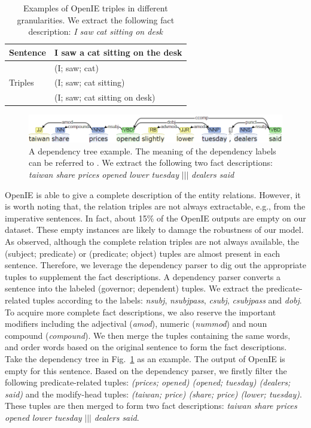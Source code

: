 \documentclass[letterpaper]{article} %
\begin{document}
	\begin{table}[t]
		\centering
		\begin{tabular}{l|l}
			\hline
			Sentence                   & I saw a cat sitting on the desk \\ \hline
			\multirow{3}{*}{Triples} & (I; saw; cat)                \\ \cline{2-2} 
			& (I; saw; cat sitting)           \\ \cline{2-2} 
			& (I; saw; cat sitting on desk)   \\ \hline
		\end{tabular}
		\caption{Examples of OpenIE triples in different granularities. We extract the following fact description: \textit{I saw cat sitting on desk}}
		\label{tb:openie_triple}
	\end{table}
	
	\begin{figure}
		\centering
		\includegraphics[width=0.75\linewidth]{depparse}
		\caption{A dependency tree example. The meaning of the dependency labels can be referred to \cite{de2008stanford}. We extract the following two fact descriptions: \textit{taiwan share prices opened lower tuesday} $|||$ \textit{dealers said}}
		\label{fig:depparse}
	\end{figure}
	
	OpenIE is able to give a complete description of the entity relations.
	However, it is worth noting that, the relation triples are not always extractable, e.g., from the imperative sentences.
	In fact, about 15\% of the OpenIE outputs are empty on our dataset.
	These empty instances are likely to damage the robustness of our model.
	As observed, although the complete relation triples are not always available, the (subject; predicate) or (predicate; object) tuples are almost present in each sentence.
	Therefore, we leverage the dependency parser to dig out the appropriate tuples to supplement the fact descriptions.
	A dependency parser converts a sentence into the labeled (governor; dependent) tuples.
	We extract the predicate-related tuples according to the labels: \textit{nsubj}, \textit{nsubjpass}, \textit{csubj}, \textit{csubjpass} and \textit{dobj}.
	To acquire more complete fact descriptions, we also reserve the important modifiers including the adjectival (\textit{amod}), numeric (\textit{nummod}) and noun compound (\textit{compound}).
	We then merge the tuples containing the same words, and order words based on the original sentence to form the fact descriptions.
	Take the dependency tree in Fig.~\ref{fig:depparse} as an example.
	The output of OpenIE is empty for this sentence.
	Based on the dependency parser, we firstly filter the following predicate-related tuples: \textit{(prices; opened) (opened; tuesday) (dealers; said)} and the modify-head tuples: \textit{(taiwan; price) (share; price)  (lower; tuesday)}.
	These tuples are then merged to form two fact descriptions: \textit{taiwan share prices opened lower tuesday} $|||$ \textit{dealers said}.  
	
\end{document}
